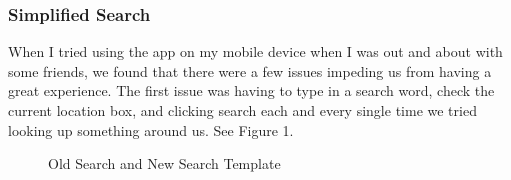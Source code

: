 \documentclass[11pt]{article}
\begin{document}
\subsubsection{Simplified Search}
When I tried using the app on my mobile device when I was out and about with some friends, we found that there were a few issues impeding us from having a great experience. The first issue was having to type in a search word, check the current location box, and clicking search each and every single time we tried looking up something around us. See Figure 1.

\begin{figure}[H]
    \centering
    \qquad
    \caption{Old Search and New Search Template}
\end{figure}
\end{document}
